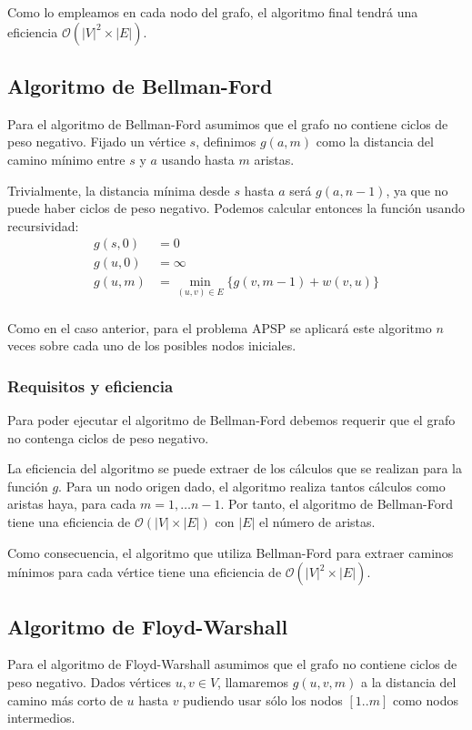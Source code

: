\documentclass[a4paper, 11pt]{article} %
\begin{document}
      Como lo empleamos en cada nodo del grafo, el algoritmo final tendrá una eficiencia $\mathcal{O}(|V|^2\times |E|)$. 

  \subsection{Algoritmo de Bellman-Ford}
    Para el algoritmo de Bellman-Ford asumimos que el grafo no contiene ciclos de peso negativo.
    Fijado un vértice $s$, definimos $g(a,m)$ como la distancia del camino mínimo entre $s$ y $a$
    usando hasta $m$ aristas.
    
    Trivialmente, la distancia mínima desde $s$ hasta $a$ será $g(a,n-1)$, ya que no puede
    haber ciclos de peso negativo. Podemos calcular entonces la función usando recursividad:
    \begin{equation} 
      \begin{split}
	g(s,0)  &=  0 \\
	g(u,0)  &=  \infty \\
	g(u,m)  &=  \min_{(u,v) \in E} \{g(v,m-1) + w(v,u)\} \\
      \end{split}
    \end{equation}

    Como en el caso anterior, para el problema APSP se aplicará este algoritmo $n$ veces sobre cada uno
    de los posibles nodos iniciales.

    \subsubsection{Requisitos y eficiencia}
      Para poder ejecutar el algoritmo de Bellman-Ford debemos requerir que el grafo
      no contenga ciclos de peso negativo.
      
      La eficiencia del algoritmo se puede extraer de los cálculos que se realizan para la función $g$. Para un nodo origen dado, el algoritmo realiza tantos cálculos como aristas haya, para cada $m = 1,\dots n-1$. Por tanto, el algoritmo de Bellman-Ford tiene una eficiencia de $\mathcal{O}(|V|\times |E|)$ con $|E|$ el número de aristas.
      
      Como consecuencia, el algoritmo que utiliza Bellman-Ford para extraer caminos mínimos para cada vértice tiene una eficiencia de $\mathcal{O}(|V|^2\times |E|)$.
      
      
      
    \subsection{Algoritmo de Floyd-Warshall}
      Para el algoritmo de Floyd-Warshall asumimos que el grafo no contiene ciclos de peso negativo.
      Dados vértices $u,v \in V$, llamaremos $g(u,v,m)$ a la distancia del camino más corto de $u$
      hasta $v$ pudiendo usar sólo los nodos $[1..m]$ como nodos intermedios.
      
\end{document}
